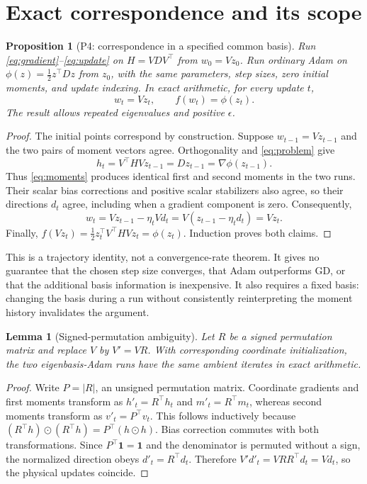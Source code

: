 \documentclass[11pt,a4paper]{article}
\newtheorem{proposition}{Proposition}
\newtheorem{lemma}{Lemma}
\begin{document}
\section{Exact correspondence and its scope}
\begin{proposition}[P4: correspondence in a specified common basis]
\label{prop:p4}
Run \eqref{eq:gradient}--\eqref{eq:update} on $H=VDV^\top$ from $w_0=Vz_0$.
Run ordinary Adam on $\phi(z)=\tfrac12 z^\top Dz$ from $z_0$, with the same
parameters, step sizes, zero initial moments, and update indexing. In exact
arithmetic, for every update $t$,
\begin{equation}
 w_t=Vz_t,\qquad f(w_t)=\phi(z_t).
 \label{eq:correspondence}
\end{equation}
The result allows repeated eigenvalues and positive $\epsilon$.
\end{proposition}
\begin{proof}
The initial points correspond by construction. Suppose $w_{t-1}=Vz_{t-1}$ and
the two pairs of moment vectors agree. Orthogonality and
\eqref{eq:problem} give
\[
 h_t=V^\top HVz_{t-1}=Dz_{t-1}=\nabla\phi(z_{t-1}).
\]
Thus \eqref{eq:moments} produces identical first and second moments in the two
runs. Their scalar bias corrections and positive scalar stabilizers also agree,
so their directions $d_t$ agree, including when a gradient component is zero.
Consequently,
\[
 w_t=Vz_{t-1}-\eta_tVd_t
     =V(z_{t-1}-\eta_td_t)=Vz_t.
\]
Finally, $f(Vz_t)=\tfrac12z_t^\top V^\top HVz_t=\phi(z_t)$.
Induction proves both claims.
\end{proof}

This is a trajectory identity, not a convergence-rate theorem. It gives no
guarantee that the chosen step size converges, that Adam outperforms GD, or that
the additional basis information is inexpensive. It also requires a fixed
basis: changing the basis during a run without consistently reinterpreting the
moment history invalidates the argument.

\begin{lemma}[Signed-permutation ambiguity]
\label{lem:sign}
Let $R$ be a signed permutation matrix and replace $V$ by $V'=VR$.
With corresponding coordinate initialization, the two eigenbasis-Adam runs
have the same ambient iterates in exact arithmetic.
\end{lemma}
\begin{proof}
Write $P=|R|$, an unsigned permutation matrix. Coordinate gradients and first
moments transform as $h'_t=R^\top h_t$ and $m'_t=R^\top m_t$, whereas second
moments transform as $v'_t=P^\top v_t$. This follows inductively because
$(R^\top h)\odot(R^\top h)=P^\top(h\odot h)$.
Bias correction commutes with both transformations. Since $P^\top\mathbf1=
\mathbf1$ and the denominator is permuted without a sign, the normalized
direction obeys $d'_t=R^\top d_t$. Therefore
$V'd'_t=VRR^\top d_t=Vd_t$, so the physical updates coincide.
\end{proof}
\end{document}
